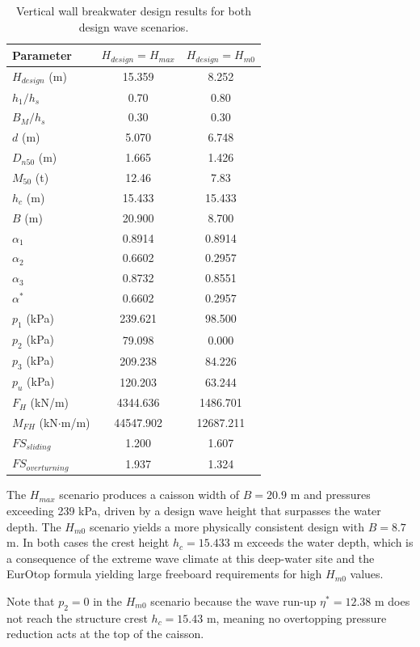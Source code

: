 \documentclass[a4paper, 11pt]{article}
\begin{document}
\begin{table}[H]
\centering
\caption{Vertical wall breakwater design results for both design wave scenarios.}
\label{tab:q2results}
\begin{tabular}{lcc}
\hline
\textbf{Parameter} & \textbf{$H_{design} = H_{max}$} & \textbf{$H_{design} = H_{m0}$} \\
\hline
$H_{design}$ (m) & 15.359 & 8.252 \\
$h_1/h_s$ & 0.70 & 0.80 \\
$B_M/h_s$ & 0.30 & 0.30 \\
$d$ (m) & 5.070 & 6.748 \\
$D_{n50}$ (m) & 1.665 & 1.426 \\
$M_{50}$ (t) & 12.46 & 7.83 \\
$h_c$ (m) & 15.433 & 15.433 \\
$B$ (m) & 20.900 & 8.700 \\
$\alpha_1$ & 0.8914 & 0.8914 \\
$\alpha_2$ & 0.6602 & 0.2957 \\
$\alpha_3$ & 0.8732 & 0.8551 \\
$\alpha^*$ & 0.6602 & 0.2957 \\
$p_1$ (kPa) & 239.621 & 98.500 \\
$p_2$ (kPa) & 79.098 & 0.000 \\
$p_3$ (kPa) & 209.238 & 84.226 \\
$p_u$ (kPa) & 120.203 & 63.244 \\
$F_H$ (kN/m) & 4344.636 & 1486.701 \\
$M_{FH}$ (kN$\cdot$m/m) & 44547.902 & 12687.211 \\
$FS_{sliding}$ & 1.200 & 1.607 \\
$FS_{overturning}$ & 1.937 & 1.324 \\
\hline
\end{tabular}
\end{table}

The $H_{max}$ scenario produces a caisson width of $B = 20.9$ m and pressures exceeding 239 kPa, driven by a design wave height that surpasses the water depth. The $H_{m0}$ scenario yields a more physically consistent design with $B = 8.7$ m. In both cases the crest height $h_c = 15.433$ m exceeds the water depth, which is a consequence of the extreme wave climate at this deep-water site and the EurOtop formula yielding large freeboard requirements for high $H_{m0}$ values.

Note that $p_2 = 0$ in the $H_{m0}$ scenario because the wave run-up $\eta^* = 12.38$ m does not reach the structure crest $h_c = 15.43$ m, meaning no overtopping pressure reduction acts at the top of the caisson.
\end{document}
